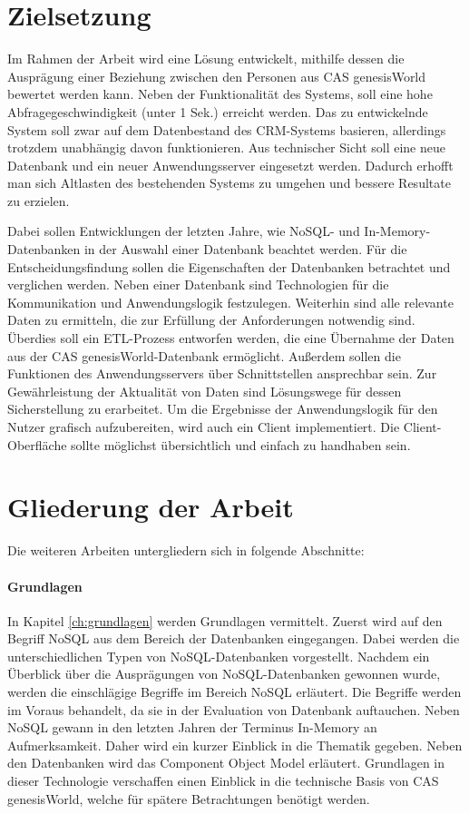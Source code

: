 \section{Zielsetzung}
\label{ch:Einfuehrung:sec:Zielsetzung}

Im Rahmen der Arbeit wird eine Lösung entwickelt, mithilfe dessen die Ausprägung einer Beziehung zwischen den Personen aus CAS genesisWorld bewertet werden kann. Neben der Funktionalität des Systems, soll eine hohe Abfragegeschwindigkeit (unter 1 Sek.) erreicht werden. Das zu entwickelnde System soll zwar auf dem Datenbestand des CRM-Systems basieren, allerdings trotzdem unabhängig davon funktionieren. Aus technischer Sicht soll eine neue Datenbank und ein neuer Anwendungsserver eingesetzt werden. Dadurch erhofft man sich Altlasten des bestehenden Systems zu umgehen und bessere Resultate zu erzielen. 

Dabei sollen Entwicklungen der letzten Jahre, wie NoSQL- und In-Memory-Datenbanken in der Auswahl einer Datenbank beachtet werden. Für die Entscheidungsfindung sollen die Eigenschaften der Datenbanken betrachtet und verglichen werden. Neben einer Datenbank sind Technologien für die Kommunikation und Anwendungslogik festzulegen. Weiterhin sind alle relevante Daten zu ermitteln, die zur Erfüllung der Anforderungen notwendig sind. Überdies soll ein ETL-Prozess entworfen werden, die eine Übernahme der Daten aus der CAS genesisWorld-Datenbank ermöglicht. Außerdem sollen die Funktionen des Anwendungsservers über Schnittstellen ansprechbar sein. Zur Gewährleistung der Aktualität von Daten sind Lösungswege für dessen Sicherstellung zu erarbeitet. Um die Ergebnisse der Anwendungslogik für den Nutzer grafisch aufzubereiten, wird auch ein Client implementiert. Die Client-Oberfläche sollte möglichst übersichtlich und einfach zu handhaben sein.

\section{Gliederung der Arbeit}
\label{ch:Einfuehrung:sec:Gliederung}

Die weiteren Arbeiten untergliedern sich in folgende Abschnitte: 
 
\paragraph{Grundlagen} In Kapitel \ref{ch:grundlagen} werden Grundlagen vermittelt. Zuerst wird auf den Begriff NoSQL aus dem Bereich der Datenbanken eingegangen. Dabei werden die unterschiedlichen Typen von NoSQL-Datenbanken vorgestellt. Nachdem ein Überblick über die Ausprägungen von NoSQL-Datenbanken gewonnen wurde, werden die einschlägige Begriffe im Bereich NoSQL erläutert. Die Begriffe werden im Voraus behandelt, da sie in der Evaluation von Datenbank auftauchen. Neben NoSQL gewann in den letzten Jahren der Terminus In-Memory an Aufmerksamkeit. Daher wird ein kurzer Einblick in die Thematik gegeben. Neben den Datenbanken wird das Component Object Model erläutert. Grundlagen in dieser Technologie verschaffen einen Einblick in die technische Basis von CAS genesisWorld, welche für spätere Betrachtungen benötigt werden. 

